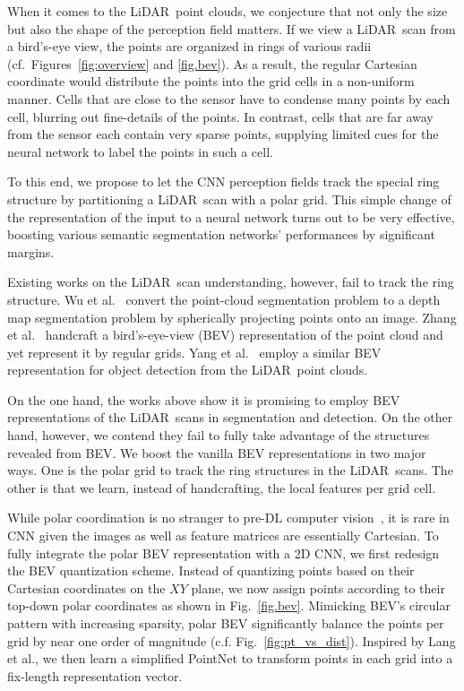 \documentclass[10pt,twocolumn,letterpaper]{article}
\newcommand{\lidar}{\mbox{LiDAR }}
\begin{document}
When it comes to the \lidar point clouds, we conjecture that not only the size but also the shape of the perception field matters. If we view a \lidar scan from a bird's-eye view, the points are organized in rings of various radii (cf.\ Figures~\ref{fig:overview} and  \ref{fig.bev}). As a result, the regular Cartesian coordinate would distribute the points into the grid cells in a non-uniform manner. Cells that are close to the sensor have to condense many points by each cell, blurring out fine-details of the points. In contrast, cells that are far away from the sensor each contain very sparse points, supplying limited cues for the neural network to label the points in such a cell. 

To this end, we propose to let the CNN perception fields track the special ring structure by partitioning a \lidar scan with a polar grid.  This simple change of the representation of the input to a neural network turns out to be very effective, boosting various semantic segmentation networks' performances by significant margins. 

Existing works on the \lidar scan understanding, however, fail to track the ring structure. Wu et al.~\cite{wu2019squeezesegv2} convert the point-cloud segmentation problem to a depth map segmentation problem by spherically projecting points onto an image. Zhang et al.~\cite{zhang2018efficient} handcraft a bird's-eye-view (BEV) representation of the point cloud and yet represent it by regular grids. Yang et al.~\cite{yang2018pixor} employ a similar BEV representation for object detection from the \lidar point clouds. 

On the one hand, the works above show it is promising to employ BEV representations of the \lidar scans in segmentation and detection. On the other hand, however, we contend they fail to fully take advantage of the structures revealed from BEV. We boost the vanilla BEV representations in two major ways. One is the polar grid to track the ring structures in the \lidar scans. The other is that we learn, instead of handcrafting, the local features per grid cell.

While polar coordination is no stranger to pre-DL computer vision~\cite{belongie2001shape}, it is rare in CNN given the images as well as feature matrices are essentially Cartesian. To fully integrate the polar BEV representation with a 2D CNN, we first redesign the BEV quantization scheme. Instead of quantizing points based on their Cartesian coordinates on the $XY$ plane, we now assign points according to their top-down polar coordinates as shown in Fig.~\ref{fig.bev}. Mimicking BEV's circular pattern with increasing sparsity, polar BEV significantly balance the points per grid by near one order of magnitude (c.f. Fig.~\ref{fig:pt_vs_dist}). Inspired by Lang et al.\cite{lang2019pointpillars}, we then learn a simplified PointNet to transform points in each grid into a fix-length representation vector. 
\end{document}
